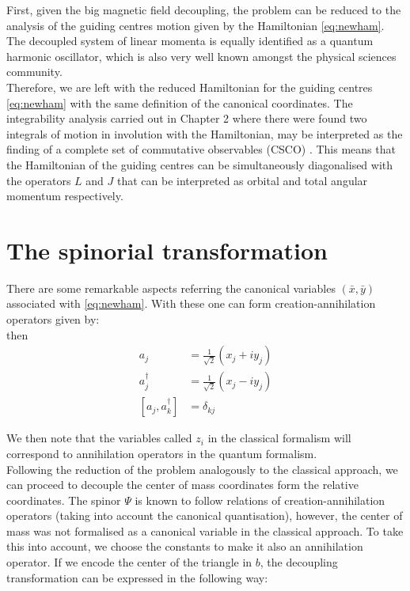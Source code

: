 First, given the big magnetic field decoupling, the problem can be reduced to the analysis of the guiding centres motion given by the Hamiltonian \eqref{eq:newham}. The decoupled system of linear momenta is equally identified as a quantum harmonic oscillator, which is also very well known amongst the physical sciences community.\\


Therefore, we are left with the reduced Hamiltonian for the guiding centres \eqref{eq:newham} with the same definition of the canonical coordinates. The integrability analysis carried out in Chapter 2 where there were found two integrals of motion in involution with the Hamiltonian, may be interpreted as the finding of a complete set of commutative observables (CSCO) \cite{csco}. This means that the Hamiltonian of the guiding centres can be simultaneously diagonalised with the operators $L$ and $J$ that can be interpreted as orbital and total angular momentum respectively.\\


\section{The spinorial transformation}
There are some remarkable aspects referring the canonical variables $(\bar{x},\bar{y})$ associated with \eqref{eq:newham}. With these one can form creation-annihilation operators given by:\\
 then 
\begin{align*}
a_j &= \frac{1}{\sqrt{2}}(x_j+iy_j)\\
a_j^\dagger &= \frac{1}{\sqrt{2}}(x_j-iy_j)\\
\left[a_j,a_k^\dagger\right] &= \delta_{kj}
\end{align*}

We then note that the variables called $z_i$ in the classical formalism will correspond to annihilation operators in the quantum formalism.\\

Following the reduction of the problem analogously to the classical approach, we can proceed to decouple the center of mass coordinates form the relative coordinates. The spinor $\Psi$ is known to follow relations of creation-annihilation operators (taking into account the canonical quantisation), however, the center of mass was not formalised as a canonical variable in the classical approach. To take this into account, we choose the constants to make it also an annihilation operator. If we encode the center of the triangle in $b$, the decoupling transformation can be expressed in the following way:\\

